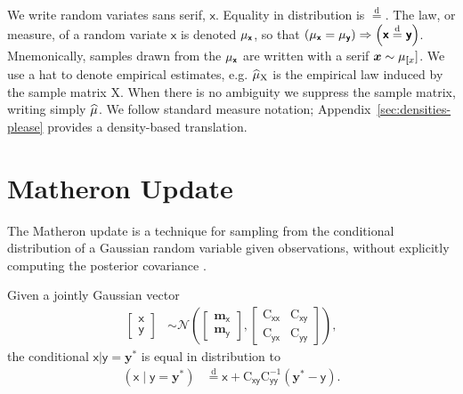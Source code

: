 \documentclass[wcp]{jmlr} %
\newcommand{\vv}[1]{\boldsymbol{#1}}
\newcommand{\mm}[1]{\mathrm{#1}}
\newcommand{\rv}[1]{\mathsf{#1}}
\newcommand{\vrv}[1]{\vv{\rv{#1}}}
\newcommand{\disteq}{\stackrel{\mathrm{d}}{=}}
\newcommand{\Normal}{\mathcal{N}}
\newcommand{\gvn}{\mid}
\begin{document}
We write random variates sans serif, $\vrv{x}$.
Equality in distribution is $\disteq$.
The law, or measure, of a random variate $\vrv{x}$ is denoted $\Law[\vrv{x}]$,
so that $\left(\Law[\vrv{x}]=\Law[\vrv{y}]\right) \Rightarrow \left(\vrv{x}\disteq\vrv{y}\right)$.
Mnemonically, samples drawn from the $\Law[\vrv{x}]$ are written with a serif $\vv{x}\sim\Law[\vrv[x]]$.
We use a hat to denote empirical estimates, e.g. \(\ELaw[\mm{X}]\) is the empirical law induced by the sample matrix \(\mm{X}\).
When there is no ambiguity we suppress the sample matrix, writing simply \(\widehat{\Law}\).
We follow standard measure notation; Appendix~\ref{sec:densities-please} provides a density-based translation.

\section{Matheron Update}

The Matheron update is a technique for sampling from the conditional distribution of a Gaussian random variable given observations, without explicitly computing the posterior covariance \citep{Doucet2010Note,Wilson2020Efficiently,Wilson2021Pathwise}.

\begin{lemma}
Given a jointly Gaussian vector
\begin{align}
    \begin{bmatrix} \vrv{x} \\ \vrv{y} \end{bmatrix}
    &\sim \Normal\left(\begin{bmatrix} \vv{m}_{\vrv{x}} \\ \vv{m}_{\vrv{y}} \end{bmatrix}, \begin{bmatrix} \mm{C}_{\vrv{xx}} & \mm{C}_{\vrv{xy}} \\ \mm{C}_{\vrv{yx}} & \mm{C}_{\vrv{yy}} \end{bmatrix}\right), \label{eq:joint-gaussian}
\end{align}
the conditional $\vrv{x} | \vrv{y} {=} \vv{y}^*$ is equal in distribution to
\begin{align}
    \left(\vrv{x} \gvn \vrv{y} {=} \vv{y}^*\right)
    &\disteq \vrv{x} + \mm{C}_{\vrv{xy}} \mm{C}_{\vrv{yy}}^{-1} \left( \vv{y}^* - \vrv{y} \right).
    \label{eq:matheron-update}
\end{align}
\end{lemma}
\end{document}
